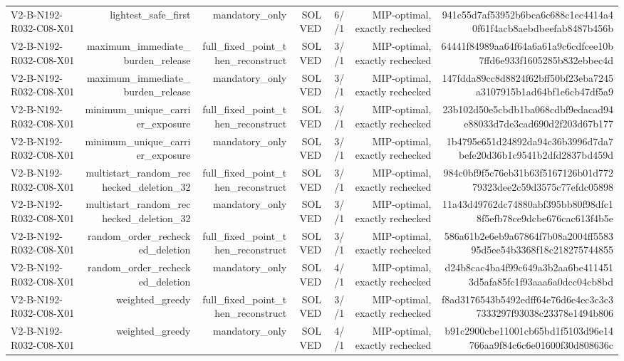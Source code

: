 {\begin{longtable}{lrrrrrr}
V2-B-N192-R032-C08-X01 & lightest\_safe\_first & mandatory\_only & SOLVED & 6//1 & MIP-optimal, exactly rechecked & 941c55d7af53952b6bca6c688c1ec4414a40f61f4acb8aebdbeefab8487b456b \\
V2-B-N192-R032-C08-X01 & maximum\_immediate\_burden\_release & full\_fixed\_point\_then\_reconstruct & SOLVED & 3//1 & MIP-optimal, exactly rechecked & 64441f84989aa64f64a6a61a9c6cdfcee10b7ffd6e933f1605285b832ebbec4d \\
V2-B-N192-R032-C08-X01 & maximum\_immediate\_burden\_release & mandatory\_only & SOLVED & 3//1 & MIP-optimal, exactly rechecked & 147fdda89cc8d8824f62bff50bf23eba7245a3107915b1ad64bf1e6cb47df5a9 \\
V2-B-N192-R032-C08-X01 & minimum\_unique\_carrier\_exposure & full\_fixed\_point\_then\_reconstruct & SOLVED & 3//1 & MIP-optimal, exactly rechecked & 23b102d50e5cbdb1ba068cdbf9edacad94e88033d7de3cad690d2f203d67b177 \\
V2-B-N192-R032-C08-X01 & minimum\_unique\_carrier\_exposure & mandatory\_only & SOLVED & 3//1 & MIP-optimal, exactly rechecked & 1b4795e651d24892da94c36b3996d7da7befe20d36b1c9541b2dfd2837bd459d \\
V2-B-N192-R032-C08-X01 & multistart\_random\_rechecked\_deletion\_32 & full\_fixed\_point\_then\_reconstruct & SOLVED & 3//1 & MIP-optimal, exactly rechecked & 984c0bf9f5c76eb31b63f5167126b01d77279323dee2c59d3575c77efdc05898 \\
V2-B-N192-R032-C08-X01 & multistart\_random\_rechecked\_deletion\_32 & mandatory\_only & SOLVED & 3//1 & MIP-optimal, exactly rechecked & 11a43d49762dc74880abf395bb80f98dfc18f5efb78ce9dcbe676cac613f4b5e \\
V2-B-N192-R032-C08-X01 & random\_order\_rechecked\_deletion & full\_fixed\_point\_then\_reconstruct & SOLVED & 3//1 & MIP-optimal, exactly rechecked & 586a61b2e6eb9a67864f7b08a2004ff558395d5ee54b3368f18c218275744855 \\
V2-B-N192-R032-C08-X01 & random\_order\_rechecked\_deletion & mandatory\_only & SOLVED & 4//1 & MIP-optimal, exactly rechecked & d24b8cac4ba4f99c649a3b2aa6be4114513d5afa85fc1f93aaa6a0dcc04cb8bd \\
V2-B-N192-R032-C08-X01 & weighted\_greedy & full\_fixed\_point\_then\_reconstruct & SOLVED & 3//1 & MIP-optimal, exactly rechecked & f8ad3176543b5492edff64e76d6e4ec3c3c37333297f93038c23378e1494b806 \\
V2-B-N192-R032-C08-X01 & weighted\_greedy & mandatory\_only & SOLVED & 4//1 & MIP-optimal, exactly rechecked & b91c2900cbe11001cb65bd1f5103d96e14766aa9f84c6c6e01600f30d808636c \\

\end{longtable}}
